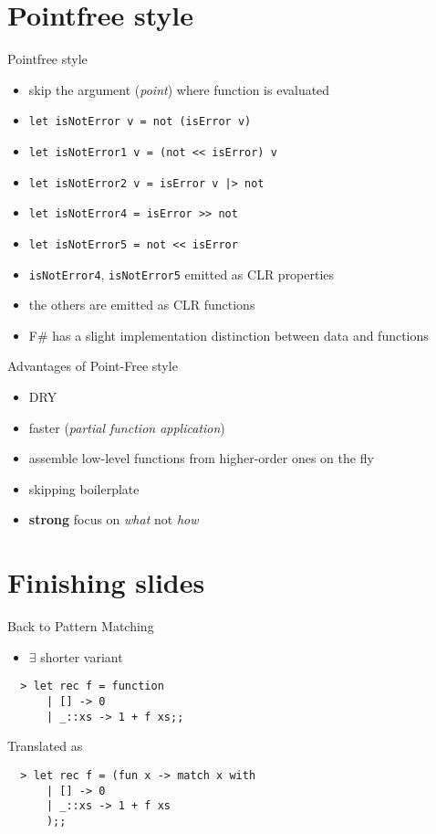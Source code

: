 \documentclass{beamer}
\begin{document}
\section{Pointfree style}
\frame{\tableofcontents[currentsection]}

\begin{frame}{Pointfree style}
  \begin{itemize}[<+->]
    \item skip the argument (\textit{point}) where function is evaluated
    \item \texttt{let isNotError v = not (isError v)}
    \item \texttt{let isNotError1 v = (not << isError) v}
    \item \texttt{let isNotError2 v = isError v |> not}
    \item \texttt{let isNotError4 = isError >> not}
    \item \texttt{let isNotError5 = not << isError}
    \item \texttt{isNotError4}, \texttt{isNotError5} emitted as CLR properties
    \item the others are emitted as CLR functions
    \item F\# has a slight implementation distinction between data and functions
  \end{itemize}
\end{frame}

\begin{frame}{Advantages of Point-Free style}
  \begin{itemize}[<+->]
    \item DRY
    \item faster (\textit{partial function application})
    \item assemble low-level functions from higher-order ones on the fly
    \item skipping boilerplate
    \item \textbf{strong} focus on \textit{what} not \textit{how}
  \end{itemize}
\end{frame}

\section{Finishing slides}
\frame{\tableofcontents[currentsection]}

\begin{frame}[fragile]{Back to Pattern Matching}
  \begin{itemize}
    \item $\exists$ shorter variant
  \end{itemize}
  \begin{verbatim}
  > let rec f = function
      | [] -> 0
      | _::xs -> 1 + f xs;;
  \end{verbatim}
  \pause
  Translated as
  \begin{verbatim}
  > let rec f = (fun x -> match x with
      | [] -> 0
      | _::xs -> 1 + f xs
      );;
  \end{verbatim}
\end{frame}
\end{document}
